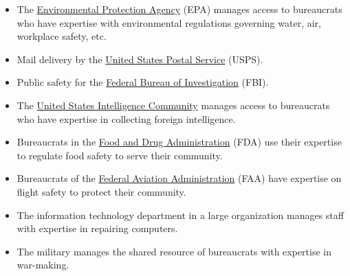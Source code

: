   \begin{itemize}
      \item The \href{https://en.wikipedia.org/wiki/United_States_Environmental_Protection_Agency}{Environmental Protection Agency} (EPA) manages access to bureaucrats who have expertise with environmental regulations governing water, air, workplace safety, etc.

      \item Mail delivery by the \href{https://en.wikipedia.org/wiki/United_States_Postal_Service}{United States Postal Service} (USPS).
%
\iftoggle{WPinmargin}{\marginpar{$>$Wikipedia: USPS}}{}

      \item Public safety for the \href{https://en.wikipedia.org/wiki/Federal_Bureau_of_Investigation}{Federal Bureau of Investigation} (FBI).
%
%

      \item The \href{https://www.intelligence.gov/}{United States Intelligence Community} manages access to bureaucrats who have expertise in collecting foreign intelligence.

      \item Bureaucrats in the \href{https://www.fda.gov/}{Food and Drug Administration} (FDA) use their expertise to regulate food safety to serve their community.


      \item Bureaucrats of the \href{https://www.faa.gov/}{Federal Aviation Administration} (FAA) have expertise on flight safety to protect their community.


      \item The information technology department in a large organization manages staff with expertise in repairing computers.%
      \item The military manages the shared resource of bureaucrats with expertise in war-making.
  \end{itemize}

